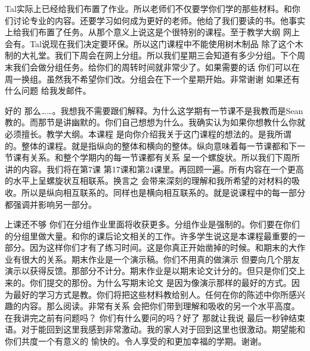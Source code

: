 Tal实际上已经给我们布置了作业。所以老师们不仅要学你们学的那些材料。和你们讨论专业的内容。还要学习如何成为更好的老师。他给了我们要读的书。他事实上给我们布置了任务。从那个意义上说这是个很特别的课程。至于教学大纲 网上会有。Tal说现在我们决定要环保。所以这门课程中不能使用树木制品 除了这个木制的大礼堂。我们下周会在网上分组。所以我们星期三会知道有多少分组。下个周末我们会做分组任务。给你们的周转时间就非常少了。如果需要的话 你们可以在周一换组。虽然我不希望你们改。分组会在下一个星期开始。非常谢谢 如果还有什么问题 给我发邮件。 

好的 那么……。我想我不需要跟们解释。为什么这学期有一节课不是我教而是Sean教的。而那节是讲幽默的。你们自己想想为什么。我确实认为如果你想教什么你就必须擅长。教学大纲。本课程 是向你介绍我关于这门课程的想法的。是我所谓的。整体的课程。就是指纵向的整体和横向的整体。纵向意味着每一节课都和下一节课有关系。和整个学期内的每一节课都有关系 呈一个螺旋状。所以我们下周所讲的内容。我们将在第7课 第17课和第24课里。再回顾一遍。所有内容在一个更高的水平上呈螺旋状互相联系。换言之 会带来深刻的理解和我所希望的对材料的吸收。所以是纵向相互联系的。同样也是横向相互联系的。就是说课程中的每一部分都强调并影响另一部分。 

上课还不够 你们在分组作业里面将收获更多。分组作业是强制的。你们要在你们的分组里做大量。和你的课后论文相关的工作。许多学生说这是本课程最重要的一部分。因为这样你们才有了练习时间。这是你真正开始凿掉的时候。和期末的大作业有很大的关系。期末作业是一个演示稿。你们不用真的做演示 但要向几个朋友演示以获得反馈。那部分不计分。期末作业是以期末论文计分的。但只是你们交上来的。你们提交的那份。为什么写期末论文 是因为像演示那样的最好的方式。因为最好的学习方式是教。你们将把这些材料教给别人。任何在你的陈述中你所感兴趣的内容。那么阅读。非常有关系 会把你们带到理解和吸收的另一个水平高度。在我讲完之前有问题吗？ 你们有什么要问的吗？好了 那就让我说 最后一秒钟结束语。对于能回到这里我感到非常激动。我的家人对于回到这里也很激动。期望能和你们共度一个有意义的 愉快的。令人享受的和更加幸福的学期。谢谢。 

